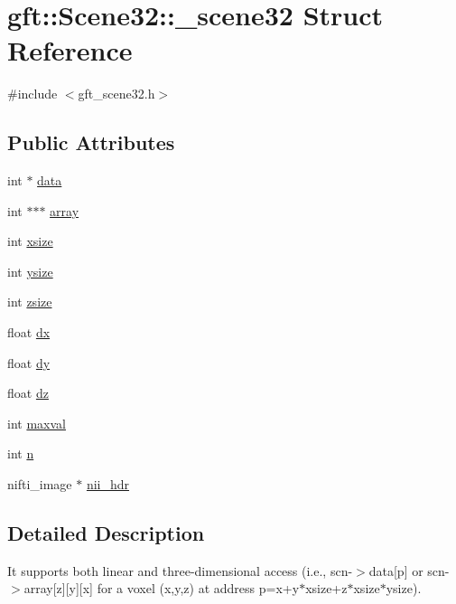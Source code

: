 \hypertarget{structgft_1_1Scene32_1_1__scene32}{}\section{gft\+:\+:Scene32\+:\+:\+\_\+scene32 Struct Reference}
\label{structgft_1_1Scene32_1_1__scene32}


{\ttfamily \#include $<$gft\+\_\+scene32.\+h$>$}

\subsection*{Public Attributes}
\begin{DoxyCompactItemize}
\item 
int $\ast$ \hyperlink{structgft_1_1Scene32_1_1__scene32_ad8f0a2cac9d910500269fca4e8c435fa}{data}
\item 
int $\ast$$\ast$$\ast$ \hyperlink{structgft_1_1Scene32_1_1__scene32_a438883984869d1b9716fb7d8bee74b56}{array}
\item 
int \hyperlink{structgft_1_1Scene32_1_1__scene32_a89930668fe4a94196d383cd25abec2a9}{xsize}
\item 
int \hyperlink{structgft_1_1Scene32_1_1__scene32_aa77d48ddba1f5845e63aa4f14d78aeaa}{ysize}
\item 
int \hyperlink{structgft_1_1Scene32_1_1__scene32_af18d678198189cc926207beba928dedd}{zsize}
\item 
float \hyperlink{structgft_1_1Scene32_1_1__scene32_aaba85b569f07295bbaf686c0d1df304d}{dx}
\item 
float \hyperlink{structgft_1_1Scene32_1_1__scene32_a929d2abebc85a0d848cd3cc0d34fc93a}{dy}
\item 
float \hyperlink{structgft_1_1Scene32_1_1__scene32_a76e9c55696d214a152b875824dda6825}{dz}
\item 
int \hyperlink{structgft_1_1Scene32_1_1__scene32_a42b25d5d4256cf65b3c4d75afd5d7f0b}{maxval}
\item 
int \hyperlink{structgft_1_1Scene32_1_1__scene32_ab97e3e918bb4d87db5f493cd9c13757f}{n}
\item 
nifti\+\_\+image $\ast$ \hyperlink{structgft_1_1Scene32_1_1__scene32_aa0167371c596e5754402dfd7f6ede5f8}{nii\+\_\+hdr}
\end{DoxyCompactItemize}


\subsection{Detailed Description}
It supports both linear and three-\/dimensional access (i.\+e., scn-\/$>$data\mbox{[}p\mbox{]} or scn-\/$>$array\mbox{[}z\mbox{]}\mbox{[}y\mbox{]}\mbox{[}x\mbox{]} for a voxel (x,y,z) at address p=x+y$\ast$xsize+z$\ast$xsize$\ast$ysize). 

